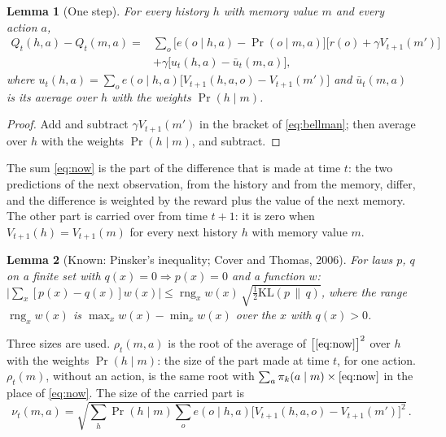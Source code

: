 \documentclass[11pt]{article}
\newtheorem{lemma}{Lemma}
\theoremstyle{definition}
\newcommand{\KL}{\mathrm{KL}}
\newcommand{\rng}{\operatorname{rng}}
\begin{document}
\begin{lemma}[One step]\label{lem:onestep}
For every history $h$ with memory value $m$ and every action $a$,
\begin{align}
Q_t(h,a)-Q_t(m,a)={}&\sum_o\big[e(o\mid h,a)-\Pr(o\mid m,a)\big]\big[r(o)+\gamma V_{t+1}(m')\big] \label{eq:now}\\
&+\gamma\big[u_t(h,a)-\bar u_t(m,a)\big], \nonumber
\end{align}
where $u_t(h,a)=\sum_oe(o\mid h,a)\big[V_{t+1}(h,a,o)-V_{t+1}(m')\big]$ and $\bar u_t(m,a)$ is its average over $h$ with the weights $\Pr(h\mid m)$.
\end{lemma}
\begin{proof}
Add and subtract $\gamma V_{t+1}(m')$ in the bracket of \eqref{eq:bellman}; then average over $h$ with the weights $\Pr(h\mid m)$, and subtract.
\end{proof}

The sum \eqref{eq:now} is the part of the difference that is made at time $t$: the two predictions of the next observation, from the history and from the memory, differ, and the difference is weighted by the reward plus the value of the next memory. The other part is carried over from time $t+1$: it is zero when $V_{t+1}(h)=V_{t+1}(m)$ for every next history $h$ with memory value $m$.

\begin{lemma}[Known: Pinsker's inequality; Cover and Thomas, 2006]\label{lem:tool}
For laws $p$, $q$ on a finite set with $q(x)=0\Rightarrow p(x)=0$ and a function $w$: $\big|\sum_x[p(x)-q(x)]w(x)\big|\le\rng_xw(x)\,\sqrt{\tfrac12\KL(p\,\|\,q)}$, where the \emph{range} $\rng_xw(x)$ is $\max_xw(x)-\min_xw(x)$ over the $x$ with $q(x)>0$.
\end{lemma}

Three sizes are used. $\rho_t(m,a)$ is the root of the average of $\big[\eqref{eq:now}\big]^2$ over $h$ with the weights $\Pr(h\mid m)$: the size of the part made at time $t$, for one action. $\rho_t(m)$, without an action, is the same root with $\sum_a\pi_k(a\mid m)\times\eqref{eq:now}$ in the place of \eqref{eq:now}. The size of the carried part is
\[
\nu_t(m,a)=\sqrt{\sum_h\Pr(h\mid m)\sum_oe(o\mid h,a)\big[V_{t+1}(h,a,o)-V_{t+1}(m')\big]^2}\,.
\]
\end{document}
